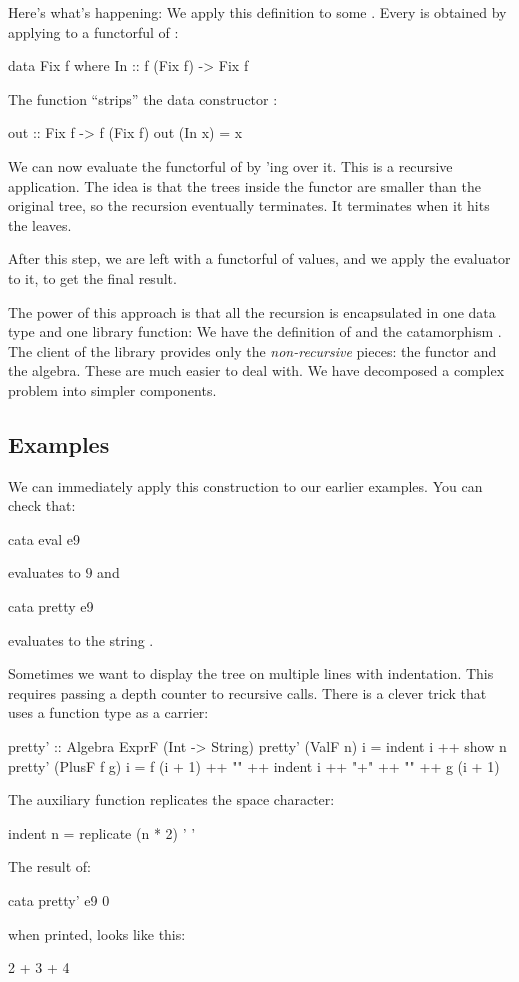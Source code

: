 \documentclass[DaoFP]{subfiles}
\begin{document}
Here's what's happening: We apply this definition to some . Every  is obtained by applying  to a functorful of :
\begin{haskell}
data Fix f where
  In :: f (Fix f) -> Fix f
\end{haskell}
The function  ``strips'' the data constructor :
\begin{haskell}
out :: Fix f -> f (Fix f)
out (In x) = x
\end{haskell}

We can now evaluate the functorful of  by 'ing  over it. This is a recursive application. The idea is that the trees inside the functor are smaller than the original tree, so the recursion eventually terminates. It terminates when it hits the leaves. 

After this step, we are left with a functorful of values, and we apply the evaluator  to it, to get the final result.

The power of this approach is that all the recursion is encapsulated in one data type and one library function: We have the definition of  and the catamorphism . The client of the library provides only the \emph{non-recursive} pieces: the functor and the algebra. These are much easier to deal with. We have decomposed a complex problem into simpler components.

\subsection{Examples}

We can immediately apply this construction to our earlier examples. You can check that:
\begin{haskell}
cata eval e9
\end{haskell}
evaluates to $9$ and
\begin{haskell}
cata pretty e9
\end{haskell}
evaluates to the string .

Sometimes we want to display the tree on multiple lines with indentation. This requires passing a depth counter to recursive calls. There is a clever trick that uses a function type as a carrier:
\begin{haskell}
pretty' :: Algebra ExprF (Int -> String)
pretty' (ValF n) i = indent i ++ show n
pretty' (PlusF f g) i = f (i + 1) ++ "\n" ++
                        indent i ++ "+" ++ "\n" ++
                        g (i + 1)
\end{haskell}
The auxiliary function  replicates the space character:
\begin{haskell}
indent n = replicate (n * 2) ' '
\end{haskell}
The result of:
\begin{haskell}
cata pretty' e9 0
\end{haskell}
when printed, looks like this:
\begin{haskell}
    2
  +
    3
+
  4
\end{haskell}
\end{document}
